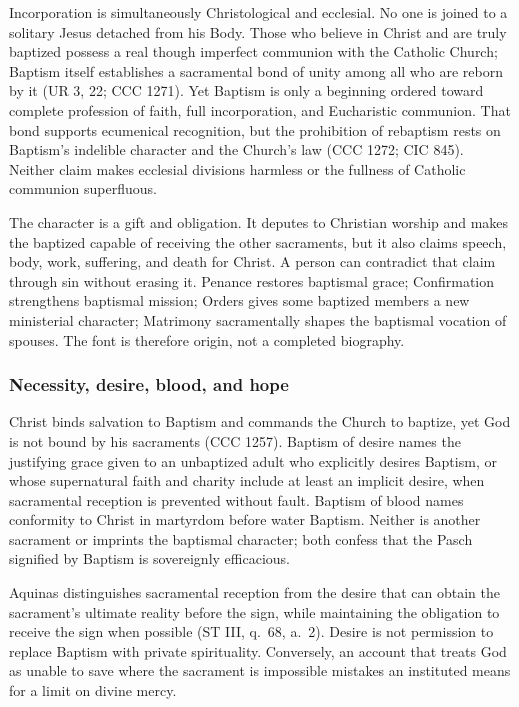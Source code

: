 Incorporation is simultaneously Christological and ecclesial. No one is joined to a solitary Jesus detached from his Body. Those who believe in Christ and are truly baptized possess a real though imperfect communion with the Catholic Church; Baptism itself establishes a sacramental bond of unity among all who are reborn by it (UR 3, 22; CCC 1271). Yet Baptism is only a beginning ordered toward complete profession of faith, full incorporation, and Eucharistic communion. That bond supports ecumenical recognition, but the prohibition of rebaptism rests on Baptism's indelible character and the Church's law (CCC 1272; CIC 845). Neither claim makes ecclesial divisions harmless or the fullness of Catholic communion superfluous.

The character is a gift and obligation. It deputes to Christian worship and makes the baptized capable of receiving the other sacraments, but it also claims speech, body, work, suffering, and death for Christ. A person can contradict that claim through sin without erasing it. Penance restores baptismal grace; Confirmation strengthens baptismal mission; Orders gives some baptized members a new ministerial character; Matrimony sacramentally shapes the baptismal vocation of spouses. The font is therefore origin, not a completed biography.

\subsubsection{Necessity, desire, blood, and hope}

Christ binds salvation to Baptism and commands the Church to baptize, yet God is not bound by his sacraments (CCC 1257). Baptism of desire names the justifying grace given to an unbaptized adult who explicitly desires Baptism, or whose supernatural faith and charity include at least an implicit desire, when sacramental reception is prevented without fault. Baptism of blood names conformity to Christ in martyrdom before water Baptism. Neither is another sacrament or imprints the baptismal character; both confess that the Pasch signified by Baptism is sovereignly efficacious.

Aquinas distinguishes sacramental reception from the desire that can obtain the sacrament's ultimate reality before the sign, while maintaining the obligation to receive the sign when possible (ST III, q.~68, a.~2). Desire is not permission to replace Baptism with private spirituality. Conversely, an account that treats God as unable to save where the sacrament is impossible mistakes an instituted means for a limit on divine mercy.

